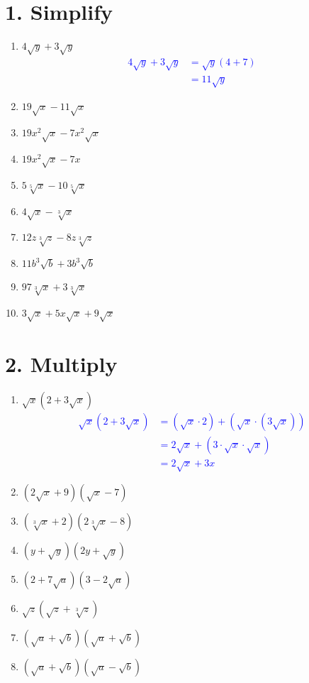 \documentclass{hw}
\begin{document}
\section*{\normalsize 1. Simplify}
\begin{enumerate}[label=\alph*.]
    \item $4\sqrt{y} + 3\sqrt{y}$
    \textcolor{blue}{
        \begin{align*}
            4\sqrt{y} + 3\sqrt{y} &= \sqrt{y}(4 + 7) \\
                                  &= 11\sqrt{y} 
        \end{align*}
    }
    \item $19\sqrt{x} - 11\sqrt{x}$
    \studentlargeworkspace
    \item $19x^2\sqrt{x} - 7x^2\sqrt{x}$
    \studentlargeworkspace
    \item $19x^2\sqrt{x} - 7x$
    \studentlargeworkspace
    \item $5\sqrt[5]{x} - 10\sqrt[5]{x}$
    \studentlargeworkspace
    \item $4\sqrt{x} - \sqrt[3]{x}$
    \studentlargeworkspace
    \item $12z\sqrt[3]{z} - 8z\sqrt[3]{z}$
    \studentlargeworkspace
    \item $11b^3\sqrt{b} + 3b^3\sqrt{b}$
    \studentlargeworkspace
    \item $97\sqrt[3]{x} + 3\sqrt[3]{x}$
    \studentlargeworkspace
    \item $3\sqrt{x} + 5x\sqrt{x} + 9\sqrt{x}$
    \studentlargeworkspace
\end{enumerate}

\section*{\normalsize 2. Multiply}
\begin{enumerate}[label=\alph*.]
    \item $\sqrt{x} (2 + 3\sqrt{x})$
    \textcolor{blue}{
        \begin{align*}
            \sqrt{x} (2 + 3\sqrt{x}) &= (\sqrt{x} \cdot 2) + (\sqrt{x} \cdot (3\sqrt{x})) \\
                                     &= 2\sqrt{x} + (3 \cdot \sqrt{x} \cdot {\sqrt{x}}) \\
                                     &= 2\sqrt{x} + 3x
        \end{align*}
    }
    \item $(2\sqrt{x} + 9) (\sqrt{x} - 7)$
    \studentlargeworkspace
    \item $(\sqrt[3]{x} + 2) (2\sqrt[3]{x} - 8)$
    \studentxlargeworkspace
    \item $(y + \sqrt{y}) (2y + \sqrt{y})$
    \studentxlargeworkspace
    \item $(2 + 7\sqrt{a}) (3 - 2\sqrt{a})$
    \studentxlargeworkspace
    \item $\sqrt{z} (\sqrt{z} + \sqrt[3]{z})$
    \studentlargeworkspace
    \item $(\sqrt{a} + \sqrt{b}) (\sqrt{a} + \sqrt{b})$
    \studentxlargeworkspace
    \item $(\sqrt{a} + \sqrt{b}) (\sqrt{a} - \sqrt{b})$
    \studentxlargeworkspace
\end{enumerate}
\end{document}
